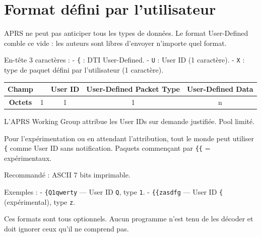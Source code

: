 \chapter[FORMAT DÉFINI PAR L'UTILISATEUR]{Format défini par
l'utilisateur}\label{format-duxe9fini-par-lutilisateur}

APRS ne peut pas anticiper tous les types de données. Le format
User-Defined comble ce vide : les auteurs sont libres d'envoyer
n'importe quel format.

En-tête 3 caractères : - \texttt{\{} : DTI User-Defined. - \texttt{U} :
User ID (1 caractère). - \texttt{X} : type de paquet défini par
l'utilisateur (1 caractère).

\begin{center}
\begin{tabular}{|c|c|c|c|c|}
\hline
\textbf{Champ} & \lit{\{} & User ID & User-Defined Packet Type & User-Defined Data \\
\hline
\textbf{Octets} & 1 & 1 & 1 & n \\
\hline
\end{tabular}
\end{center}

L'APRS Working Group attribue les User IDs sur demande justifiée. Pool
limité.

Pour l'expérimentation ou en attendant l'attribution, tout le monde peut
utiliser \texttt{\{} comme User ID sans notification. Paquets commençant
par \texttt{\{\{} = expérimentaux.

Recommandé : ASCII 7 bits imprimable.

Exemples : - \texttt{\{Q1qwerty} --- User ID \texttt{Q}, type
\texttt{1}. - \texttt{\{\{zasdfg} --- User ID \texttt{\{}
(expérimental), type \texttt{z}.

Ces formats sont tous optionnels. Aucun programme n'est tenu de les
décoder et doit ignorer ceux qu'il ne comprend pas.

